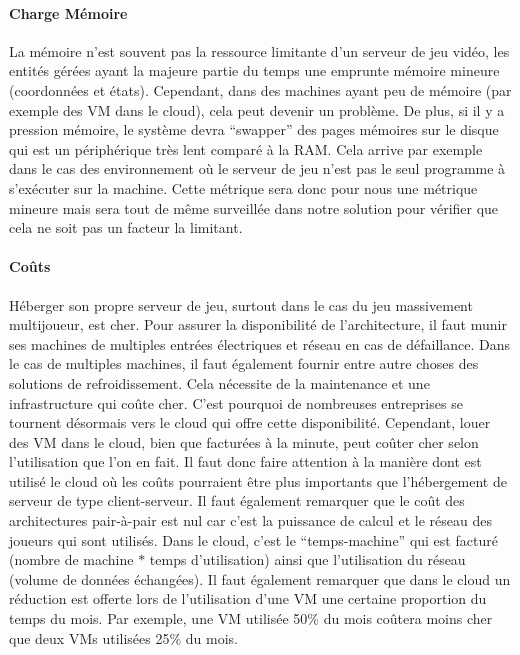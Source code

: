 \paragraph{Charge Mémoire\\}
La mémoire n'est souvent pas la ressource limitante d'un serveur de jeu vidéo, les entités gérées ayant la majeure partie du temps une emprunte mémoire mineure (coordonnées et états).
Cependant, dans des machines ayant peu de mémoire (par exemple des VM dans le cloud), cela peut devenir un problème.
De plus, si il y a pression mémoire, le système devra ``swapper'' des pages mémoires sur le disque qui est un périphérique très lent comparé à la RAM.
Cela arrive par exemple dans le cas des environnement où le serveur de jeu n'est pas le seul programme à s'exécuter sur la machine.
Cette métrique sera donc pour nous une métrique mineure mais sera tout de même surveillée dans notre solution pour vérifier que cela ne soit pas un facteur la limitant.

\paragraph{Coûts\\}
Héberger son propre serveur de jeu, surtout dans le cas du jeu massivement multijoueur, est cher.
Pour assurer la disponibilité de l'architecture, il faut munir ses machines de multiples entrées électriques et réseau en cas de défaillance.
Dans le cas de multiples machines, il faut également fournir entre autre choses des solutions de refroidissement.
Cela nécessite de la maintenance et une infrastructure qui coûte cher.
C'est pourquoi de nombreuses entreprises se tournent désormais vers le cloud qui offre cette disponibilité.
Cependant, louer des VM dans le cloud, bien que facturées à la minute, peut coûter cher selon l'utilisation que l'on en fait.
Il faut donc faire attention à la manière dont est utilisé le cloud où les coûts pourraient être plus importants que l'hébergement de serveur de type client-serveur.
Il faut également remarquer que le coût des architectures pair-à-pair est nul car c'est la puissance de calcul et le réseau des joueurs qui sont utilisés.
Dans le cloud, c'est le ``temps-machine'' qui est facturé (nombre de machine $*$ temps d'utilisation) ainsi que l'utilisation du réseau (volume de données échangées).
Il faut également remarquer que dans le cloud un réduction est offerte lors de l'utilisation d'une VM une certaine proportion du temps du mois.
Par exemple, une VM utilisée 50\% du mois coûtera moins cher que deux VMs utilisées 25\% du mois.

